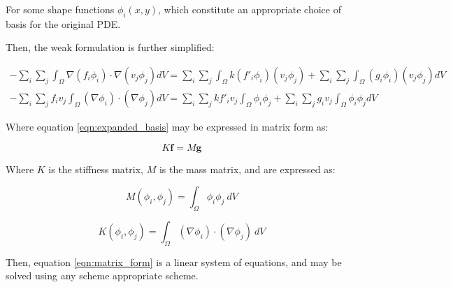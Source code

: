 For some shape functions $\phi_i(x,y)$, which constitute an appropriate choice of basis for the original PDE.

Then, the weak formulation is further simplified:

\begin{align}
    - \sum_i \sum_j \int_\Omega \nabla(f_i \phi_i) \cdot \nabla(v_j \phi_j) dV = \sum_i \sum_j \int_\Omega k (f'_i \phi_i) (v_j \phi_j) + \sum_i \sum_j \int_\Omega (g_i \phi_i) (v_j \phi_j) dV \\
    - \sum_i \sum_j f_i v_j \int_\Omega (\nabla \phi_i) \cdot (\nabla \phi_j) dV = \sum_i \sum_j k f'_i v_j \int_\Omega  \phi_i \phi_j+ \sum_i \sum_j g_i v_j \int_\Omega \phi_i \phi_j dV \label{eqn:expanded_basis}
\end{align}

Where equation \ref{eqn:expanded_basis} may be expressed in matrix form as:

\begin{equation}
K \mathbf{f} = M \mathbf{g} \label{eqn:matrix_form}
\end{equation}

Where $K$ is the stiffness matrix, $M$ is the mass matrix, and are expressed as:

\begin{equation}
    M(\phi_i,\phi_j) = \int_{\Omega}\phi_i \phi_j~dV
    \label{eqn:mass_matrix}
\end{equation}

\begin{equation}
    K(\phi_i,\phi_j) = \int_{\Omega}(\nabla\phi_i)\cdot (\nabla\phi_j)~dV
    \label{eqn:stiffness_matrix}
\end{equation}

Then, equation \ref{eqn:matrix_form} is a linear system of equations, and may be solved using any scheme appropriate scheme.